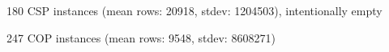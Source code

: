 \newcommand{\solvbasecsp}{67}
\newcommand{\solvlazycsp}{36}
\newcommand{\solvbasecop}{75}
\newcommand{\solvlazycop}{58}
\newcommand{\NA}{--}

\begin{table}[htbp]
    \centering
    \caption{\tableCaption}
    \label{tbl:res}

    \begin{subtable}{\textwidth}
        \centering
        \caption{180 CSP instances (mean rows: \num{20918}, stdev: \num{1204503}), \sat intentionally empty}
        \label{tbl:res:csp}
        
    \end{subtable}

    \vspace{1em}

    \begin{subtable}{\textwidth}
        \centering
        \caption{247 COP instances (mean rows: \num{9548}, stdev: \num{8608271})}
        \label{tbl:res:cop}
        
    \end{subtable}

\end{table}